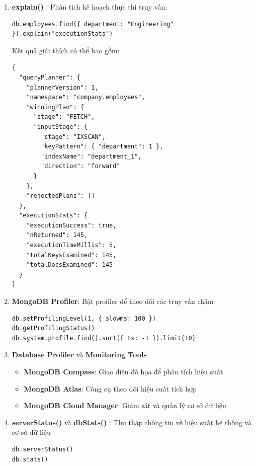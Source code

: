 \begin{enumerate}
    \item \textbf{explain()} :  Phân tích kế hoạch thực thi truy vấn:
\begin{lstlisting}[style=mongodb, caption=Ví dụ explain() trong MongoDB, label=mongodb:example]
db.employees.find({ department: "Engineering" }).explain("executionStats")
\end{lstlisting}

Kết quả giải thích có thể bao gồm:

\begin{lstlisting}[style=mongodb, caption=Kết quả explain() trong MongoDB, label=mongodb:example]
{
  "queryPlanner": {
    "plannerVersion": 1,
    "namespace": "company.employees",
    "winningPlan": {
      "stage": "FETCH",
      "inputStage": {
        "stage": "IXSCAN",
        "keyPattern": { "department": 1 },
        "indexName": "department_1",
        "direction": "forward"
      }
    },
    "rejectedPlans": []
  },
  "executionStats": {
    "executionSuccess": true,
    "nReturned": 145,
    "executionTimeMillis": 5,
    "totalKeysExamined": 145,
    "totalDocsExamined": 145
  }
}
\end{lstlisting}


    \item \textbf{MongoDB Profiler}: Bật profiler để theo dõi các truy vấn chậm
\begin{lstlisting}[style=mongodb, caption=Ví dụ Bật profiler để theo dõi các truy vấn chậm trong MongoDB, label=mongodb:example]
db.setProfilingLevel(1, { slowms: 100 })
db.getProfilingStatus()
db.system.profile.find().sort({ ts: -1 }).limit(10)
\end{lstlisting}

    \item \textbf{Database Profiler} và \textbf{Monitoring Tools}
    \begin{itemize}
        \item \textbf{MongoDB Compass}: Giao diện đồ họa để phân tích hiệu suất
        \item \textbf{MongoDB Atlas}: Công cụ theo dõi hiệu suất tích hợp
        \item \textbf{MongoDB Cloud Manager}: Giám sát và quản lý cơ sở dữ liệu
    \end{itemize}


    \item \textbf{serverStatus()} và \textbf{dbStats()} : Thu thập thông tin về hiệu suất hệ thống và cơ sở dữ liệu
\begin{lstlisting}[style=mongodb, caption=Ví dụ serverStatus() và dbStats() trong MongoDB, label=mongodb:example]
db.serverStatus()
db.stats()
\end{lstlisting}

\end{enumerate}


